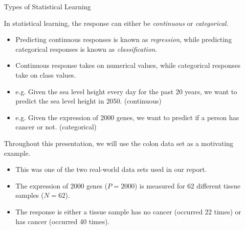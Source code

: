\documentclass[8pt]{beamer}
\newcommand{\mys}{\vspace{0.5cm} %
}
\begin{document}
\begin{frame}{Types of Statistical Learning}

In statistical learning, the response can either be \textit{continuous} or \textit{categorical}.
\begin{itemize}
    \item Predicting continuous responses is known as \textit{regression}, while predicting categorical responses is known as \textit{classification}.
    \item Continuous response takes on numerical values, while categorical responses take on class values.
    \item e.g. Given the sea level height every day for the past 20 years, we want to predict the sea level height in 2050. (continuous)
    \item e.g. Given the expression of 2000 genes, we want to predict if a person has cancer or not. (categorical)
\end{itemize} \mys

Throughout this presentation, we will use the colon data set as a motivating example.
\begin{itemize}
    \item This was one of the two real-world data sets used in our report.
    \item The expression of 2000 genes ($P=2000$) is measured for 62 different tissue samples ($N = 62$).
    \item The response is either a tissue sample has no cancer (occurred 22 times) or has cancer (occurred 40 times).
\end{itemize}
    
\end{frame}
\end{document}
